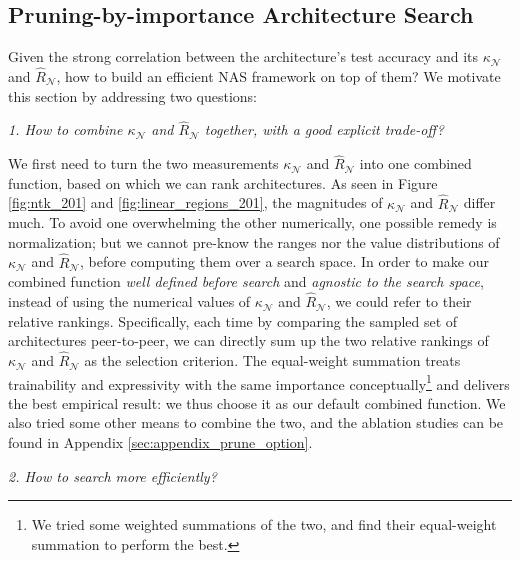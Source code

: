 \documentclass{article} \usepackage{iclr2021_conference,times}
\begin{document}
\vspace{-0.5em}

\subsection{Pruning-by-importance Architecture Search}\label{sec:pruning_search}

\vspace{-0.5em}

Given the strong correlation between the architecture's test accuracy and its $\kappa_\mathcal{N}$ and $\hat{R}_\mathcal{N}$, how to build an efficient NAS framework on top of them? We motivate this section by addressing two questions:

\vspace{-0.5em}
\textit{1. How to combine $\kappa_\mathcal{N}$ and $\hat{R}_\mathcal{N}$ together, with a good explicit trade-off?}

We first need to turn the two measurements $\kappa_\mathcal{N}$ and $\hat{R}_\mathcal{N}$ into one combined function, based on which we can rank architectures. As seen in Figure \ref{fig:ntk_201} and \ref{fig:linear_regions_201}, the magnitudes of $\kappa_\mathcal{N}$ and $\hat{R}_\mathcal{N}$ differ much. To avoid one overwhelming the other numerically, one possible remedy is normalization; but we cannot pre-know the ranges nor the value distributions of $\kappa_\mathcal{N}$ and $\hat{R}_\mathcal{N}$, before computing them over a search space. In order to make our combined function \textit{well defined before search} and \textit{agnostic to the search space}, instead of using the numerical values of $\kappa_\mathcal{N}$ and $\hat{R}_\mathcal{N}$, we could refer to their relative rankings. Specifically, each time by comparing the sampled set of architectures peer-to-peer, we can directly sum up the two relative rankings of $\kappa_\mathcal{N}$ and $\hat{R}_\mathcal{N}$ as the selection criterion. The equal-weight summation treats trainability and expressivity with the same importance conceptually\footnote{We tried some weighted summations of the two, and find their equal-weight summation to perform the best.} and delivers the best empirical result: we thus choose it as our default combined function. We also tried some other means to combine the two, and the ablation studies can be found in Appendix \ref{sec:appendix_prune_option}.







\vspace{-0.5em}
\textit{2. How to search more efficiently?}
\end{document}
